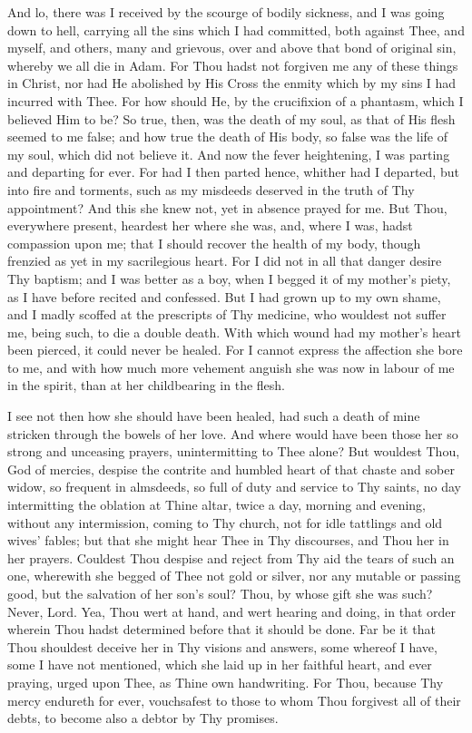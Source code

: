 \documentclass[b5paper,openright,12pt,twoside]{book}
\begin{document}
And lo, there was I received by the scourge of bodily sickness, and I
was going down to hell, carrying all the sins which I had committed,
both against Thee, and myself, and others, many and grievous, over and
above that bond of original sin, whereby we all die in Adam. For
Thou hadst not forgiven me any of these things in Christ, nor had He
abolished by His Cross the enmity which by my sins I had incurred with
Thee. For how should He, by the crucifixion of a phantasm, which I
believed Him to be? So true, then, was the death of my soul, as that
of His flesh seemed to me false; and how true the death of His body,
so false was the life of my soul, which did not believe it. And now the
fever heightening, I was parting and departing for ever. For had I then
parted hence, whither had I departed, but into fire and torments, such
as my misdeeds deserved in the truth of Thy appointment? And this she
knew not, yet in absence prayed for me. But Thou, everywhere present,
heardest her where she was, and, where I was, hadst compassion upon me;
that I should recover the health of my body, though frenzied as yet
in my sacrilegious heart. For I did not in all that danger desire Thy
baptism; and I was better as a boy, when I begged it of my mother's
piety, as I have before recited and confessed. But I had grown up to my
own shame, and I madly scoffed at the prescripts of Thy medicine, who
wouldest not suffer me, being such, to die a double death. With which
wound had my mother's heart been pierced, it could never be healed. For
I cannot express the affection she bore to me, and with how much more
vehement anguish she was now in labour of me in the spirit, than at her
childbearing in the flesh.

I see not then how she should have been healed, had such a death of mine
stricken through the bowels of her love. And where would have been those
her so strong and unceasing prayers, unintermitting to Thee alone? But
wouldest Thou, God of mercies, despise the contrite and humbled heart of
that chaste and sober widow, so frequent in almsdeeds, so full of duty
and service to Thy saints, no day intermitting the oblation at Thine
altar, twice a day, morning and evening, without any intermission,
coming to Thy church, not for idle tattlings and old wives' fables; but
that she might hear Thee in Thy discourses, and Thou her in her prayers.
Couldest Thou despise and reject from Thy aid the tears of such an one,
wherewith she begged of Thee not gold or silver, nor any mutable or
passing good, but the salvation of her son's soul? Thou, by whose gift
she was such? Never, Lord. Yea, Thou wert at hand, and wert hearing and
doing, in that order wherein Thou hadst determined before that it should
be done. Far be it that Thou shouldest deceive her in Thy visions and
answers, some whereof I have, some I have not mentioned, which she laid
up in her faithful heart, and ever praying, urged upon Thee, as
Thine own handwriting. For Thou, because Thy mercy endureth for ever,
vouchsafest to those to whom Thou forgivest all of their debts, to
become also a debtor by Thy promises.
\end{document}
